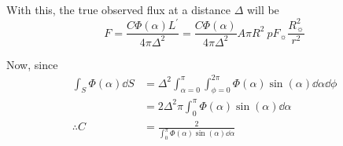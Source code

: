 \documentclass{momento}
\begin{document}
With this, the true observed flux at a distance $\Delta$ will be
\begin{equation}
  \label{eq:5}
  F = \frac{C \Phi(\alpha) L^{\prime}}{4 \pi \Delta^2} 
    = \frac{C \Phi(\alpha)}{4 \pi \Delta^2} A \pi R^2~p F_{\sun} \frac{R_{\sun}^2}{r^2}
\end{equation}

Now, since
\begin{align*}
  \int_S \Phi(\alpha) \dd{S} & = \Delta^2 \int_{\alpha=0}^{\pi} \int_{\phi=0}^{2\pi} \Phi(\alpha) \sin(\alpha) \dd{\alpha} \dd{\phi} \\
                             & = 2 \Delta^2 \pi \int_0^{\pi} \Phi(\alpha) \sin(\alpha) \dd{\alpha}                                   \\
  \therefore C               & = \frac{2}{\int_0^{\pi} \Phi(\alpha) \sin(\alpha) \dd{\alpha}}
\end{align*}

\appendices
\end{document}
